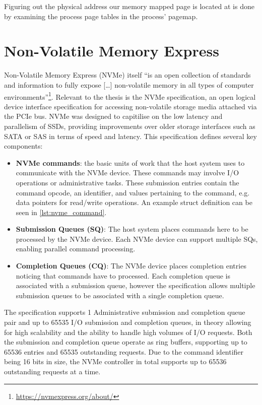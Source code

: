 Figuring out the physical address our memory mapped page is located at is done by examining the process page tables in the process' pagemap.


\section{Non-Volatile Memory Express}
Non-Volatile Memory Express (NVMe) itself ``is an open collection of standards and information to fully expose [\ldots] non-volatile memory in all types of computer environments''\footnote{\url{https://nvmexpress.org/about/}}. Relevant to the thesis is the NVMe specification, an open logical device interface specification for accessing non-volatile storage media attached via the PCIe bus. NVMe was designed to capitilise on the low latency and parallelism of SSDs, providing improvements over older storage interfaces such as SATA or SAS in terms of speed and latency. This specification defines several key components:

\begin{itemize}
        \item \textbf{NVMe commands}: the basic units of work that the host system uses to communicate with the NVMe device. These commands may involve I/O operations or administrative tasks. These submission entries contain the command opcode, an identifier, and values pertaining to the command, e.g. data pointers for read/write operations. An example struct definition can be seen in \autoref{lst:nvme_command}.
        \item \textbf{Submission Queues (SQ)}: The host system places commands here to be processed by the NVMe device. Each NVMe device can support multiple SQs, enabling parallel command processing.
        \item \textbf{Completion Queues (CQ)}: The NVMe device places completion entries noticing that commands have to processed. Each completion queue is associated with a submission queue, however the specification allows multiple submission queues to be associated with a single completion queue.
\end{itemize}

The specification supports 1 Administrative submission and completion queue pair and up to 65535 I/O submission and completion queues, in theory allowing for high scalability and the ability to handle high volumes of I/O requests. Both the submission and completion queue operate as ring buffers, supporting up to 65536 entries and 65535 outstanding requests. Due to the command identifier being 16 bits in size, the NVMe controller in total supports up to 65536 outstanding requests at a time.

